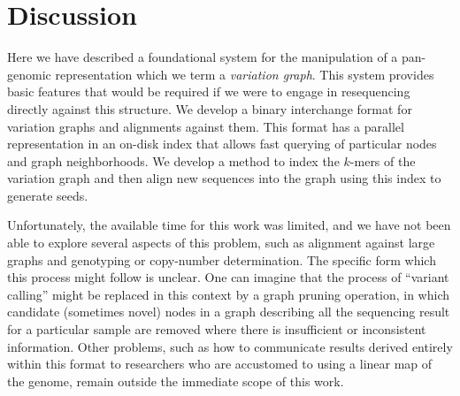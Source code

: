 \documentclass{article}
\begin{document}
\section{Discussion}

Here we have described a foundational system for the manipulation of a pan-genomic representation which we term a \emph{variation graph}. This system provides basic features that would be required if we were to engage in resequencing directly against this structure. We develop a binary interchange format for variation graphs and alignments against them. This format has a parallel representation in an on-disk index that allows fast querying of particular nodes and graph neighborhoods. We develop a method to index the $k$-mers of the variation graph and then align new sequences into the graph using this index to generate seeds.

Unfortunately, the available time for this work was limited, and we have not been able to explore several aspects of this problem, such as alignment against large graphs and genotyping or copy-number determination. The specific form which this process might follow is unclear. One can imagine that the process of ``variant calling'' might be replaced in this context by a graph pruning operation, in which candidate (sometimes novel) nodes in a graph describing all the sequencing result for a particular sample are removed where there is insufficient or inconsistent information. Other problems, such as how to communicate results derived entirely within this format to researchers who are accustomed to using a linear map of the genome, remain outside the immediate scope of this work.



{}


\end{document}

